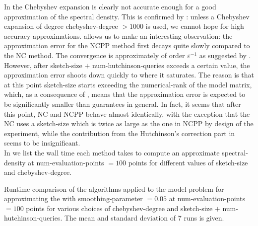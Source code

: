 In  the
Chebyshev expansion is clearly not accurate enough for a good approximation
of the spectral density. This is confirmed by :
unless a Chebyshev expansion of degree \gls{chebyshev-degree} $>1000$ is used,
we cannot hope for high accuracy approximations.
 allows us to
make an interesting observation: the approximation error for the \gls{NCPP} method
first decays quite slowly compared to the \gls{NC} method.
The convergence is approximately of order $\mathcal{\varepsilon^{-1}}$
as suggested by .
However, after \gls{sketch-size} $+$ \gls{num-hutchinson-queries}
exceeds a certain value, the approximation error shoots down quickly to where it
saturates. The reason is that at this point \gls{sketch-size} starts exceeding
the \gls{numerical-rank} of the model matrix, which, as a consequence of
, means that the approximation error is
expected to be significantly smaller than 
guarantees in general. In fact, it seems that after this point, \gls{NC} and \gls{NCPP}
behave almost identically, with the exception that the \gls{NC} uses 
a \gls{sketch-size} which is twice as large as the one in \gls{NCPP} by design
of the experiment, while the contribution from the Hutchinson's correction part
in  seems to be insignificant.\\

In  we list the wall time each method
takes to compute an approximate \gls{spectral-density} at \gls{num-evaluation-points} $=100$ points
for different values of \gls{sketch-size} and \gls{chebyshev-degree}.\\

\begin{table}[ht]
    \caption{Runtime comparison of the algorithms applied to the model problem
        for approximating the  with 
        \gls{smoothing-parameter} $=0.05$ at \gls{num-evaluation-points} $=100$
        points for various choices of \gls{chebyshev-degree} and \gls{sketch-size} $+$ \gls{num-hutchinson-queries}.
        The mean and standard deviation of 7 runs is given.}
    \label{tab:5-experiments-timing-DGC}
    
\end{table}

